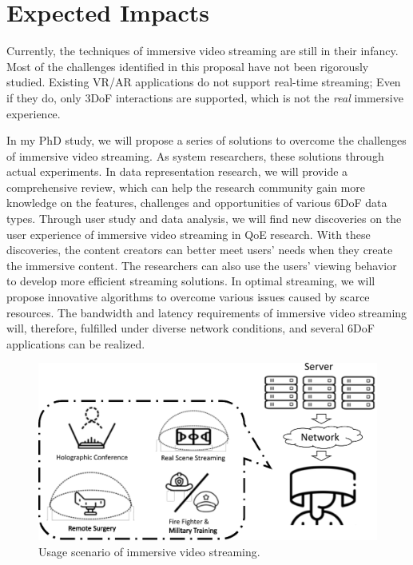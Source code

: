 \section{Expected Impacts}
Currently, the techniques of immersive video streaming are still in their infancy.
Most of the challenges identified in this proposal have not been rigorously studied.
Existing VR/AR applications do not support real-time streaming; 
Even if they do, only 3DoF interactions are supported, which is not the {\em real} immersive experience.

In my PhD study, we will propose a series of solutions to overcome the challenges of immersive video streaming.
As system researchers, these solutions through actual experiments. 
In data representation research, we will provide a comprehensive review, 
which can help the research community gain more knowledge on the features, challenges and opportunities of various 6DoF data types.
Through user study and data analysis, we will find new discoveries on the user experience of immersive video streaming in QoE research.
With these discoveries, the content creators can better meet users' needs when they create the immersive content.
The researchers can also use the users' viewing behavior to develop more efficient streaming solutions.
In optimal streaming, we will propose innovative algorithms to overcome various issues caused by scarce resources.
The bandwidth and latency requirements of immersive video streaming will, therefore, fulfilled under diverse network conditions, and
several 6DoF applications can be realized.

\begin{figure}[tbh]
	\begin{center}
		\includegraphics[width=.5\textwidth]{fig/usage_scenario}
		\caption{Usage scenario of immersive video streaming.}
		\label{fig:usage_scenario}
	\end{center}
\end{figure}

